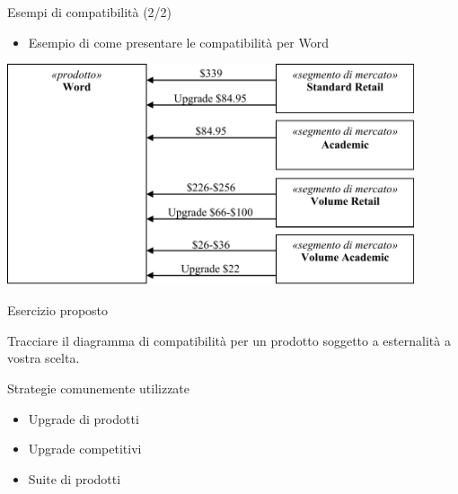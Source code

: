 \documentclass{beamer}
\begin{document}
\begin{frame}
{\centerline{Esempi di compatibilit\`{a} (2/2)}}
\begin{itemize}
    \item Esempio di come presentare le compatibilit\`{a} per Word
\end{itemize} 
\begin{center}
    \includegraphics[width=0.9\textwidth]{A2023.IDSEPC.ConcettoDiSoftware/EsempiCompatibilita.2.pdf}
\end{center}

\end{frame}

\begin{frame}
{\centerline{Esercizio proposto}}
\vspace{1cm}
\begin{center}
    \LARGE{Tracciare il diagramma di compatibilit\`{a} per un prodotto soggetto a esternalit\`{a} a vostra scelta.}
\end{center}

\end{frame}


\begin{frame}
{\centerline{Strategie comunemente utilizzate}}

\begin{itemize}
    \item Upgrade di prodotti
    \item Upgrade competitivi
    \item Suite di prodotti
\end{itemize}

\vspace{1cm}
\begin{center}
    
\end{center}

\end{frame}
\end{document}
